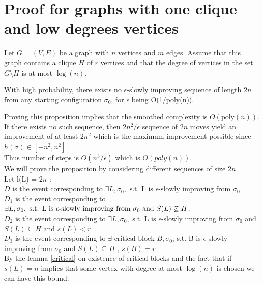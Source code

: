 \section{Proof for graphs with one clique and low degrees vertices}
\label{sec::firstProof}
Let $G = (V,E)$ be a graph with $n$ vertices and $m$ edges. Assume that this graph contains a clique $H$ of $r$ vertices and that the degree of vertices in the set $G \setminus H$ is at most $\log(n)$. \\

\begin{proposition}
\label{prop}
With high probability, there exists no $\epsilon$-slowly improving sequence of length $2n$ from any starting configuration $\sigma_0$, for $\epsilon$ being O(1/poly(n)).
\end{proposition}

Proving this proposition implies that the smoothed complexity is $O(\text{poly}(n))$. \\
If there exists no such sequence, then $2n^2/\epsilon$ sequence of $2n$ moves yield an improvement of at least $2n^2$ which is the maximum improvement possible since $h(\sigma) \in [-n^2,n^2]$. \\
Thus number of steps is $O(n^3/\epsilon)$ which is $O(poly(n))$. \\

We will prove the proposition by considering different sequences of size 2$n$.\\
Let l(L) = 2$n$ : \\
$D$ is the event corresponding to $\exists L, \sigma_0, \text{ s.t. L is }\epsilon\text{-slowly improving from }\sigma_0 $\\
$D_1$ is the event corresponding to $\exists L, \sigma_0, \text{ s.t. L is }\epsilon\text{-slowly improving from }\sigma_0 \\
\text{ and }S(L) \not\subseteq H$.\\
$D_2$ is the event corresponding to $\exists L, \sigma_0,\text{ s.t. L is }\epsilon$-slowly  improving from $\sigma_0$ and $S(L) \subseteq H\text{ and }s(L) < r$. \\
$D_3$   is the event corresponding to $\exists \text{ critical block } B, \sigma_0$, s.t. B is $\epsilon$-slowly improving from $\sigma_0$ and $S(L) \subseteq H \text{ , } s(B) = r $\\
By the lemma \ref{critical} on existence of critical blocks and the fact that if $s(L) = n$ implies that some vertex with degree at most $\log(n)$ is chosen we can have this bound:

